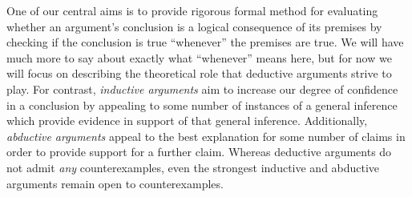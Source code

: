 \begin{earg}
\end{earg}

%
%

One of our central aims is to provide rigorous formal method for evaluating whether an argument's conclusion is a logical consequence of its premises by checking if the conclusion is true ``whenever'' the premises are true.
We will have much more to say about exactly what ``whenever'' means here, but for now we will focus on describing the theoretical role that deductive arguments strive to play.
For contrast, \textit{inductive arguments} aim to increase our degree of confidence in a conclusion by appealing to some number of instances of a general inference which provide evidence in support of that general inference.
Additionally, \textit{abductive arguments} appeal to the best explanation for some number of claims in order to provide support for a further claim. 
Whereas deductive arguments do not admit \textit{any} counterexamples, even the strongest inductive and abductive arguments remain open to counterexamples.


